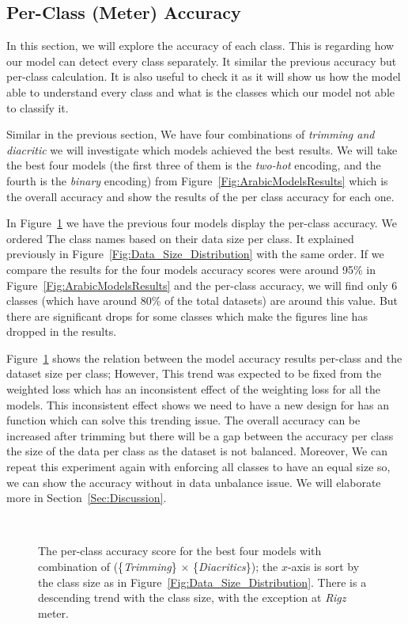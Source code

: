 \subsection{Per-Class (Meter) Accuracy}

In this section, we will explore the accuracy of each class. This is regarding how our model can detect every class separately. It similar the previous accuracy but per-class calculation. It is also useful to check it as it will show us how the model able to understand every class and what is the classes which our model not able to classify it. 

Similar in the previous section, We have four combinations of \textit{trimming and diacritic} we will investigate which models achieved the best results. We will take the best four models (the first three of them is the \textit{two-hot} encoding, and the fourth is the \textit{binary} encoding) from Figure~\ref{Fig:ArabicModelsResults} which is the overall accuracy and show the results of the per class accuracy for each one.

In Figure~\ref{Fig:Results_Per_Class} we have the previous four models display the per-class accuracy. We ordered The class names based on their data size per class. It explained previously in Figure~\ref{Fig:Data_Size_Distribution} with the same order. If we compare the results for the four models accuracy scores were around 95\% in Figure~\ref{Fig:ArabicModelsResults} and the per-class accuracy, we will find only 6 classes (which have around 80\% of the total datasets) are around this value. But there are significant drops for some classes which make the figures line has dropped in the results.

Figure~\ref{Fig:Results_Per_Class} shows the relation between the model accuracy results per-class and the dataset size per class; However, This trend was expected to be fixed from the weighted loss which has an inconsistent effect of the weighting loss for all the models. This inconsistent effect shows we need to have a new design for has an function which can solve this trending issue. The overall accuracy can be increased after trimming but there will be a gap between the accuracy per class the size of the data per class as the dataset is not balanced. Moreover, We can repeat this experiment again with enforcing all classes to have an equal size so, we can show the accuracy without in data unbalance issue. We will elaborate more in Section~\ref{Sec:Discussion}.

\begin{figure}[!t]
  
  \caption{The per-class accuracy score for the best four models with combination of (\{\textit{Trimming}\} $\times$ \{\textit{Diacritics}\}); the $x$-axis is sort by the class size as in Figure~\ref{Fig:Data_Size_Distribution}. There is a descending trend with the class size, with the exception at \textit{Rigz} meter.}~\label{Fig:Results_Per_Class}
\end{figure}

